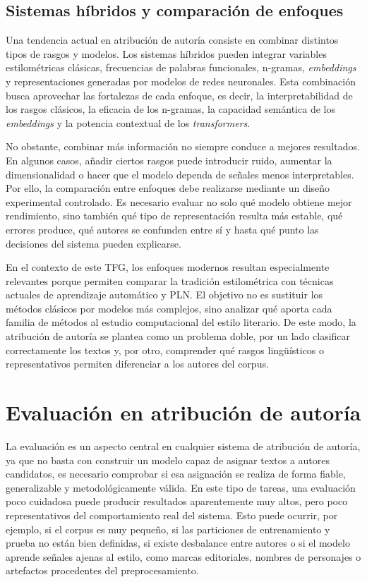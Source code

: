 \documentclass[IB]{TFUOC}%
\begin{document}
\subsection{Sistemas híbridos y comparación de enfoques}

Una tendencia actual en atribución de autoría consiste en combinar distintos tipos de rasgos y modelos. Los sistemas híbridos pueden integrar variables estilométricas clásicas, frecuencias de palabras funcionales, n-gramas, \textit{embeddings} y representaciones generadas por modelos de redes neuronales. Esta combinación busca aprovechar las fortalezas de cada enfoque, es decir, la interpretabilidad de los rasgos clásicos, la eficacia de los n-gramas, la capacidad semántica de los \textit{embeddings} y la potencia contextual de los \textit{transformers}.

No obstante, combinar más información no siempre conduce a mejores resultados. En algunos casos, añadir ciertos rasgos puede introducir ruido, aumentar la dimensionalidad o hacer que el modelo dependa de señales menos interpretables. Por ello, la comparación entre enfoques debe realizarse mediante un diseño experimental controlado. Es necesario evaluar no solo qué modelo obtiene mejor rendimiento, sino también qué tipo de representación resulta más estable, qué errores produce, qué autores se confunden entre sí y hasta qué punto las decisiones del sistema pueden explicarse.

En el contexto de este TFG, los enfoques modernos resultan especialmente relevantes porque permiten comparar la tradición estilométrica con técnicas actuales de aprendizaje automático y PLN. El objetivo no es sustituir los métodos clásicos por modelos más complejos, sino analizar qué aporta cada familia de métodos al estudio computacional del estilo literario. De este modo, la atribución de autoría se plantea como un problema doble, por un lado clasificar correctamente los textos y, por otro, comprender qué rasgos lingüísticos o representativos permiten diferenciar a los autores del corpus.

\section{Evaluación en atribución de autoría}

La evaluación es un aspecto central en cualquier sistema de atribución de autoría, ya que no basta con construir un modelo capaz de asignar textos a autores candidatos, es necesario comprobar si esa asignación se realiza de forma fiable, generalizable y metodológicamente válida. En este tipo de tareas, una evaluación poco cuidadosa puede producir resultados aparentemente muy altos, pero poco representativos del comportamiento real del sistema. Esto puede ocurrir, por ejemplo, si el corpus es muy pequeño, si las particiones de entrenamiento y prueba no están bien definidas, si existe desbalance entre autores o si el modelo aprende señales ajenas al estilo, como marcas editoriales, nombres de personajes o artefactos procedentes del preprocesamiento.
\end{document}

